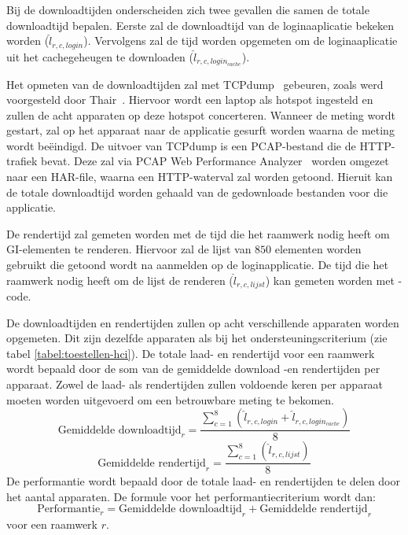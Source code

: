 Bij de downloadtijden onderscheiden zich twee gevallen die samen de totale downloadtijd bepalen.
Eerste zal de downloadtijd van de loginaaplicatie bekeken worden ($\widehat{l}_{r,c,login}$). 
Vervolgens zal de tijd worden opgemeten om de loginaaplicatie uit het cachegeheugen te downloaden ($\widehat{l}_{r,c,login_{cache}}$).

Het opmeten van de downloadtijden zal met TCPdump~\cite{Tcpdump2010} gebeuren, zoals werd voorgesteld door Thair~\cite{Thair2011}.
Hiervoor wordt een laptop als hotspot ingesteld en zullen de acht apparaten op deze hotspot concerteren.
Wanneer de meting wordt gestart, zal op het apparaat naar de applicatie gesurft worden waarna de meting wordt beëindigd. 
De uitvoer van TCPdump is een PCAP-bestand die de HTTP-trafiek bevat.
Deze zal via PCAP Web Performance Analyzer~\cite{SongL.bmcquadeMdsteele2010} worden omgezet naar een HAR-file, waarna een HTTP-waterval zal worden getoond.
Hieruit kan de totale downloadtijd worden gehaald van de gedownloade bestanden voor die applicatie.


De rendertijd zal gemeten worden met de tijd die het raamwerk nodig heeft om GI-elementen te renderen.
Hiervoor zal de lijst van $850$ elementen worden gebruikt die getoond wordt na aanmelden op de loginapplicatie.
De tijd die het raamwerk nodig heeft om de lijst de renderen ($\widehat{l}_{r,c,lijst}$) kan gemeten worden met \js-code.

De downloadtijden en rendertijden zullen op acht verschillende apparaten worden opgemeten.
Dit zijn dezelfde apparaten als bij het ondersteuningscriterium (zie tabel \ref{tabel:toestellen-hci}).
De totale laad- en rendertijd voor een raamwerk wordt bepaald door de som van de gemiddelde download -en rendertijden per apparaat.
Zowel de laad- als rendertijden zullen voldoende keren per apparaat moeten worden uitgevoerd om een betrouwbare meting te bekomen.
\begin{equation}
  \text{Gemiddelde downloadtijd}_r= \frac{\sum_{c=1}^{8}{\left(\widehat{l}_{r,c,login}+\widehat{l}_{r,c,login_{cache}}\right)}}{8}
    \label{eq:totale-downloadtijd}
\end{equation}
\begin{equation}
  \text{Gemiddelde rendertijd}_r= \frac{\sum_{c=1}^{8}{\left(\widehat{l}_{r,c,lijst}\right)}}{8}
  \label{eq:totale-gebruikerservaring}
\end{equation}
De performantie wordt bepaald door de totale laad- en rendertijden te delen door het aantal apparaten.
De formule voor het performantiecriterium wordt dan:
\begin{equation}
  \text{Performantie}_r= \text{Gemiddelde downloadtijd}_r + \text{Gemiddelde rendertijd}_r
  \label{eq:performantie}
\end{equation}
voor een raamwerk $r$.

